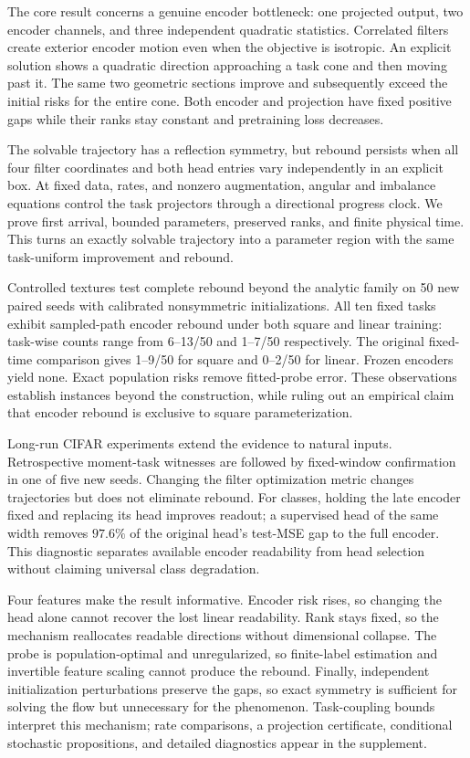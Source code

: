 The core result concerns a genuine encoder bottleneck: one projected output, two encoder channels, and three independent quadratic statistics. Correlated filters create exterior encoder motion even when the objective is isotropic. An explicit solution shows a quadratic direction approaching a task cone and then moving past it. The same two geometric sections improve and subsequently exceed the initial risks for the entire cone. Both encoder and projection have fixed positive gaps while their ranks stay constant and pretraining loss decreases.

The solvable trajectory has a reflection symmetry, but rebound persists when all four filter coordinates and both head entries vary independently in an explicit box. At fixed data, rates, and nonzero augmentation, angular and imbalance equations control the task projectors through a directional progress clock. We prove first arrival, bounded parameters, preserved ranks, and finite physical time. This turns an exactly solvable trajectory into a parameter region with the same task-uniform improvement and rebound.

Controlled textures test complete rebound beyond the analytic family on 50 new paired seeds with calibrated nonsymmetric initializations. All ten fixed tasks exhibit sampled-path encoder rebound under both square and linear training: task-wise counts range from 6--13/50 and 1--7/50 respectively. The original fixed-time comparison gives 1--9/50 for square and 0--2/50 for linear. Frozen encoders yield none. Exact population risks remove fitted-probe error. These observations establish instances beyond the construction, while ruling out an empirical claim that encoder rebound is exclusive to square parameterization.

Long-run CIFAR experiments extend the evidence to natural inputs. Retrospective moment-task witnesses are followed by fixed-window confirmation in one of five new seeds. Changing the filter optimization metric changes trajectories but does not eliminate rebound. For classes, holding the late encoder fixed and replacing its head improves readout; a supervised head of the same width removes $97.6\%$ of the original head's test-MSE gap to the full encoder. This diagnostic separates available encoder readability from head selection without claiming universal class degradation.

Four features make the result informative. Encoder risk rises, so changing the head alone cannot recover the lost linear readability. Rank stays fixed, so the mechanism reallocates readable directions without dimensional collapse. The probe is population-optimal and unregularized, so finite-label estimation and invertible feature scaling cannot produce the rebound. Finally, independent initialization perturbations preserve the gaps, so exact symmetry is sufficient for solving the flow but unnecessary for the phenomenon. Task-coupling bounds interpret this mechanism; rate comparisons, a projection certificate, conditional stochastic propositions, and detailed diagnostics appear in the supplement.

